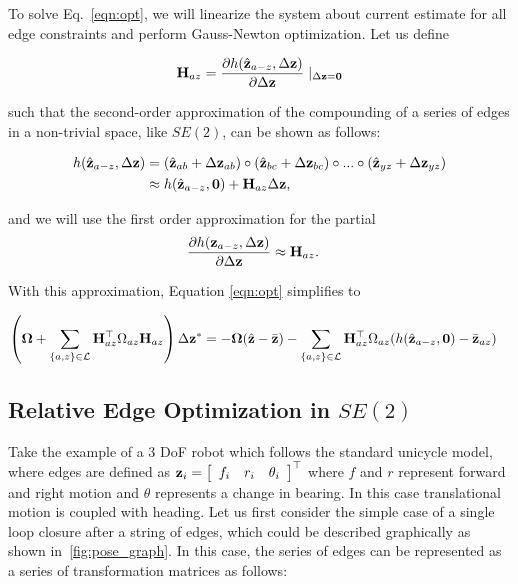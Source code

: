 To solve Eq.~\ref{eqn:opt}, we will linearize the system about current estimate for all edge constraints and perform Gauss-Newton optimization.  Let us define

\begin{align*}
  \mathbf{H}_{az} = \frac{\partial h(\hat{\mathbf{z}}_{a-z},\Delta\mathbf{z})}{\partial \Delta\mathbf{z}} \mid_{\Delta\mathbf{z} = \mathbf{0}}
\end{align*}

such that the second-order approximation of the compounding of a series of edges in a non-trivial space, like $SE(2)$, can be shown as follows:

\begin{align*}
  h(\hat{\mathbf{z}}_{a-z},\Delta\mathbf{z}) &= (\hat{\mathbf{z}}_{ab} + \Delta\mathbf{z}_{ab}) \circ (\hat{\mathbf{z}}_{bc} + \Delta\mathbf{z}_{bc}) \circ ... \circ (\hat{\mathbf{z}}_{yz} + \Delta\mathbf{z}_{yz})\\
   &\approx
  h(\hat{\mathbf{z}}_{a-z},\mathbf{0}) + \mathbf{H}_{az} \Delta\mathbf{z},
\end{align*}

and we will use the first order approximation for the partial
\begin{align*}
  \frac{\partial h(\mathbf{z}_{a-z},\Delta\mathbf{z})}{\partial \Delta\mathbf{z}} &\approx \mathbf{H}_{az}.
\end{align*}

With this approximation, Equation \ref{eqn:opt} simplifies to

\begin{align}
  \left(\boldsymbol{\Omega} + \sum_{\{a,z\} \in \mathcal{L}}
  \mathbf{H}_{az}^\top
  \Omega_{az}\mathbf{H}_{az} \right) \Delta\mathbf{z}^*
  &= -\boldsymbol{\Omega}(\hat{\mathbf{z}} -\bar{\mathbf{z}}) - \sum_{\{a,z\} \in \mathcal{L}}
  \mathbf{H}_{az}^\top
  \Omega_{az}(h(\hat{\mathbf{z}}_{a-z},\mathbf{0}) -\bar{\mathbf{z}}_{az})
  \label{eqn:3d_opt}
\end{align}

\subsection{Relative Edge Optimization in $SE(2)$}
\label{sec:relative_edge_optimization_in_se2}

Take the example of a 3 DoF robot which follows the standard unicycle model, where edges are defined as $\mathbf{z}_i = \left[\begin{array}{ccc} f_i & r_i & \theta_i \end{array}\right]^\top$ where $f$ and $r$ represent forward and right motion and $\theta$ represents a change in bearing. In this case translational motion is coupled with heading. Let us first consider the simple case of a single loop closure after a string of edges, which could be described graphically as shown in~\ref{fig:pose_graph}.  In this case, the series of edges can be represented as a series of transformation matrices as follows:

